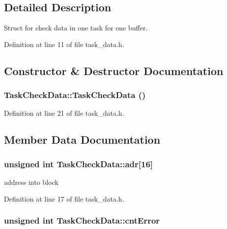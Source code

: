 \subsection{Detailed Description}
Struct for check data in one task for one buffer. 

Definition at line 11 of file task\_\-data.h.

\subsection{Constructor \& Destructor Documentation}
\hypertarget{structTaskCheckData_a44e9d9e9f7edeec5e79010a5305a9c12}{
\subsubsection[{TaskCheckData}]{\setlength{\rightskip}{0pt plus 5cm}TaskCheckData::TaskCheckData ()}}
\label{structTaskCheckData_a44e9d9e9f7edeec5e79010a5305a9c12}


Definition at line 21 of file task\_\-data.h.

\subsection{Member Data Documentation}
\hypertarget{structTaskCheckData_a4c47800bf53ca101dfa00f9729937641}{
\subsubsection[{adr}]{\setlength{\rightskip}{0pt plus 5cm}unsigned int {\bf TaskCheckData::adr}\mbox{[}16\mbox{]}}}
\label{structTaskCheckData_a4c47800bf53ca101dfa00f9729937641}


address into block 

Definition at line 17 of file task\_\-data.h.\hypertarget{structTaskCheckData_ab0a2b9d059da356011c8f5b071bc13a6}{
\subsubsection[{cntError}]{\setlength{\rightskip}{0pt plus 5cm}unsigned int {\bf TaskCheckData::cntError}}}
\label{structTaskCheckData_ab0a2b9d059da356011c8f5b071bc13a6}


